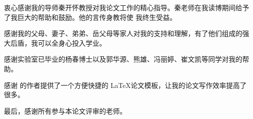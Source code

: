 \begin{acknowledgement}
  衷心感谢我的导师秦开怀教授对我论文工作的精心指导。秦老师在我读博期间给予了我巨大的帮助和鼓励。他的言传身教将使
  我终生受益。\par
  感谢我的父母、妻子、弟弟、岳父母等家人对我的支持和理解，有了他们组成的强大后盾，我可以全身心投入学业。\par
  感谢实验室已毕业的杨春博士以及郭华源、熊雄、冯丽婷、崔文凯等同学对我的帮助。\par

  感谢 \thuthesis 的作者提供了一个方便快捷的 \LaTeX 论文模板，让我的论文写作效率提高了很多。\par
  最后，感谢所有参与本论文评审的老师。
\end{acknowledgement}
